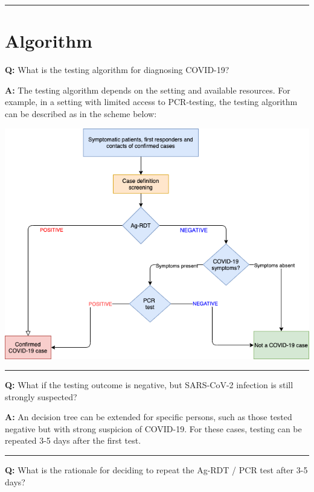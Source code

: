 \documentclass[
]{book}
\begin{document}
\begin{center}\rule{0.5\linewidth}{0.5pt}\end{center}

\hypertarget{algorithm}{%
\section{Algorithm}\label{algorithm}}

\textbf{Q:} What is the testing algorithm for diagnosing COVID-19?

\textbf{A:} The testing algorithm depends on the setting and available resources. For example, in a setting with limited access to PCR-testing, the testing algorithm can be described as in the scheme below:

\includegraphics{images/m06/Testing_algorythm.png}

\begin{center}\rule{0.5\linewidth}{0.5pt}\end{center}

\textbf{Q:} What if the testing outcome is negative, but SARS-CoV-2 infection is still strongly suspected?

\textbf{A:} An decision tree can be extended for specific persons, such as those tested negative but with strong suspicion of COVID-19. For these cases, testing can be repeated 3-5 days after the first test.

\begin{center}\rule{0.5\linewidth}{0.5pt}\end{center}

\textbf{Q:} What is the rationale for deciding to repeat the Ag-RDT / PCR test after 3-5 days?
\end{document}
